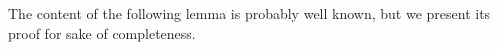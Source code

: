 \documentclass[a4paper,11pt]{article}
\numberwithin{equation}{section}
\newcommand{\eps}{\varepsilon}
\newcommand{\Om}{\Omega}
\newcommand{\rom}{\mathrm}
\theoremstyle{definition}
\begin{document}

The content of the following lemma is probably well known, but we present its proof for sake of completeness.
\end{document}
